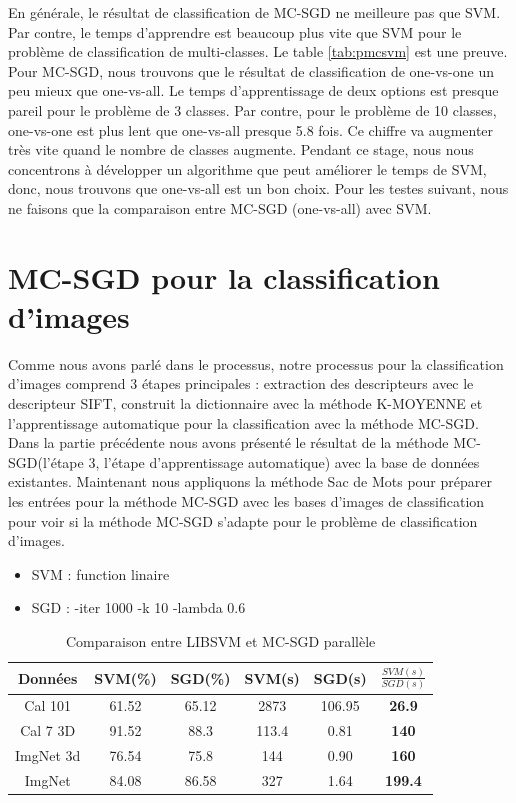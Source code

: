 En générale, le résultat de classification de MC-SGD ne meilleure pas que SVM. Par contre, le temps d'apprendre est beaucoup plus vite que SVM pour le problème de classification de multi-classes. Le table \ref{tab:pmcsvm} est une preuve.
Pour MC-SGD, nous trouvons que le résultat de classification de one-vs-one un peu mieux que one-vs-all. Le temps  d'apprentissage de deux options est presque pareil pour le problème de 3 classes. Par contre, pour le problème de 10 classes, one-vs-one est plus lent que one-vs-all presque 5.8 fois. Ce chiffre va augmenter très vite quand le nombre de classes augmente. Pendant ce stage, nous nous concentrons à développer un algorithme que peut améliorer le temps de SVM, donc, nous trouvons que one-vs-all est un bon choix. Pour les testes suivant, nous ne faisons que la comparaison entre MC-SGD (one-vs-all) avec SVM.

\section{MC-SGD pour la classification d'images}
Comme nous avons parlé dans le processus, notre processus pour la classification d'images comprend 3 étapes principales : extraction des descripteurs avec le descripteur SIFT, construit la dictionnaire avec la méthode K-MOYENNE et l'apprentissage automatique pour la classification avec la méthode MC-SGD. Dans la partie précédente nous avons présenté le résultat de la méthode MC-SGD(l'étape 3, l'étape d'apprentissage automatique) avec la base de données existantes. Maintenant nous appliquons la méthode Sac de Mots pour préparer les entrées pour la méthode MC-SGD avec les bases d'images de classification pour voir si la méthode MC-SGD s'adapte pour le problème de classification d'images.
\begin{itemize}
\item SVM : function linaire
\item SGD : -iter 1000 -k 10 -lambda 0.6
\end{itemize}

\begin{table}[h]
\begin{center}
    \begin{tabular}{ | c | c | c | c | c | c |}
    \hline
    Données & SVM(\%) & SGD(\%) & SVM(s) & SGD(s) & $\frac{SVM(s)}{SGD(s)}$ \\ \hline

    Cal 101 & 61.52 & 65.12 & 2873 & 106.95 & \textbf{26.9} \\ \hline
    
    Cal 7 3D & 91.52 & 88.3 & 113.4 & 0.81 & \textbf{140} \\ \hline 

    ImgNet 3d & 76.54 & 75.8 & 144 & 0.90 & \textbf{160} \\ \hline
    
    ImgNet & 84.08 & 86.58 & 327 & 1.64 & \textbf{199.4} \\ \hline
    
    \end{tabular}
\end{center}
\caption{Comparaison entre LIBSVM et MC-SGD parallèle}
\label{tab:pimgclasssvm}
\end{table}

